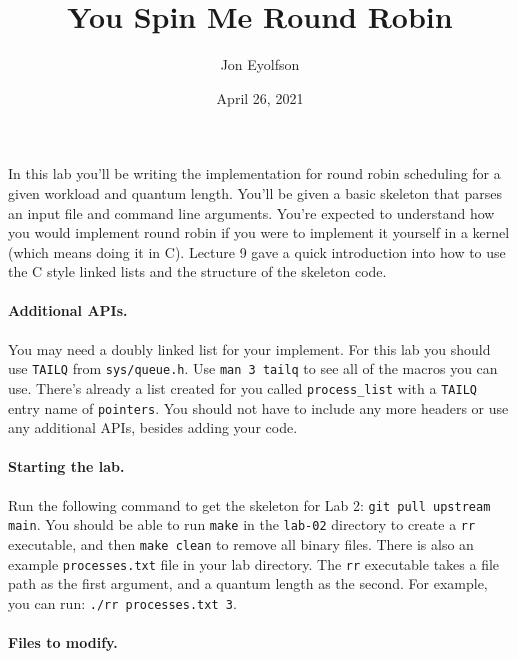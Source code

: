 

\title{You Spin Me Round Robin}
\author{Jon Eyolfson}
\date{April 26, 2021}



\maketitle

In this lab you'll be writing the implementation for round robin scheduling
for a given workload and quantum length.
You'll be given a basic skeleton that parses an input file and command line
arguments.
You're expected to understand how you would implement round robin if you were
to implement it yourself in a kernel (which means doing it in C).
Lecture 9 gave a quick introduction into how to use the C style linked lists
and the structure of the skeleton code.

\paragraph{Additional APIs.}

You may need a doubly linked list for your implement.
For this lab you should use \texttt{TAILQ} from \texttt{sys/queue.h}.
Use \texttt{man 3 tailq} to see all of the macros you can use.
There's already a list created for you called \texttt{process\_list} with a
\texttt{TAILQ} entry name of \texttt{pointers}.
You should not have to include any more headers or use any additional APIs,
besides adding your code.

\paragraph{Starting the lab.}

Run the following command to get the skeleton for Lab 2:
\texttt{git pull upstream main}.
You should be able to run \texttt{make} in the \texttt{lab-02} directory to
create a \texttt{rr} executable, and then \texttt{make clean} to remove all
binary files.
There is also an example \texttt{processes.txt} file in your lab directory.
The \texttt{rr} executable takes a file path as the first argument, and a
quantum length as the second.
For example, you can run: \texttt{./rr processes.txt 3}.

\paragraph{Files to modify.}

